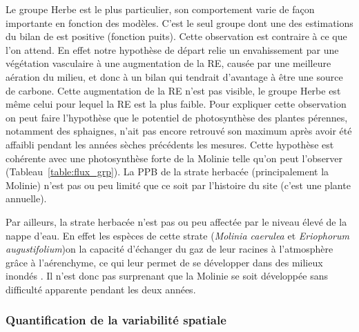 Le groupe Herbe est le plus particulier, son comportement varie de façon importante en fonction des modèles.
C'est le seul groupe dont une des estimations du bilan de \coo est positive (fonction puits).
Cette observation est contraire à ce que l'on attend.
En effet notre hypothèse de départ relie un envahissement par une végétation vasculaire à une augmentation de la RE, causée par une meilleure aération du milieu, et donc à un bilan qui tendrait d'avantage à être une source de carbone.
Cette augmentation de la RE n'est pas visible, le groupe Herbe est même celui pour lequel la RE est la plus faible.
Pour expliquer cette observation on peut faire l'hypothèse que le potentiel de photosynthèse des plantes pérennes, notamment des sphaignes, n'ait pas encore retrouvé son maximum après avoir été affaibli pendant les années sèches précédents les mesures.
Cette hypothèse est cohérente avec une photosynthèse forte de la Molinie telle qu'on peut l'observer (Tableau~\ref{table:flux_grp}).
La PPB de la strate herbacée (principalement la Molinie) n'est pas ou peu limité que ce soit par l'histoire du site (c'est une plante annuelle).

Par ailleurs, la strate herbacée n'est pas ou peu affectée par le niveau élevé de la nappe d'eau.
En effet les espèces de cette strate (\textit{Molinia caerulea} et \textit{Eriophorum augustifolium})on la capacité d'échanger du gaz de leur racines à l'atmosphère grâce à l'aérenchyme, ce qui leur permet de se développer dans des milieux inondés \citep{taylor2001,rydin2013c}.
Il n'est donc pas surprenant que la Molinie se soit développée sans difficulté apparente pendant les deux années.

\subsubsection{Quantification de la variabilité spatiale}

